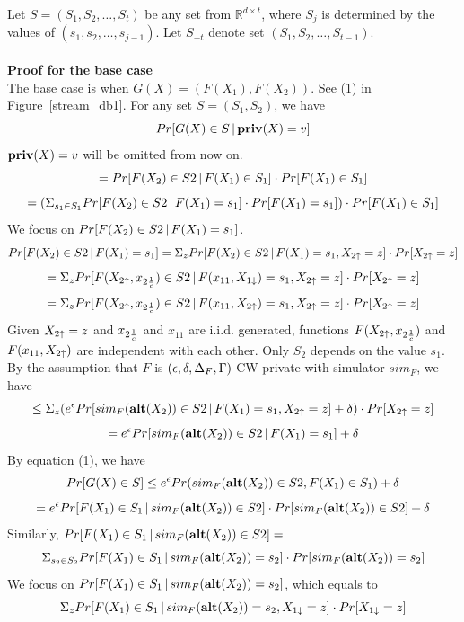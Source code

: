 \documentclass[11pt]{article}
\begin{document}
Let $S=(S_{1}, S_{2}, \dots, S_{t} )$ be any set from $\mathbb {R} ^{d \times t}$, where $S_{j}$ is determined by the values of $(s_{1}, s_{2} , \dots, s_{j-1})$. Let $S_{-t}$ denote set $(S_{1}, S_{2}, \dots, S_{t-1} )$.
\\
\\
{\bf Proof for the base case}\\
The base case is when $G(X) = (F(X_{1}) , F(X_{2}))$. See (1) in Figure~\ref{stream_db1}.
For any set $S= (S_{1}, S_{2})$, we have
\[
Pr[G(X) \in S\,|\, {\bf priv}(X) = v ]
\]
${\bf priv}(X) =v$ will be omitted from now on.
\[
=Pr[F(X_{2}) \in S{2}\,|\, F(X_{1}) \in S_{1}] \cdot Pr[F(X_{1}) \in S_{1}]
\]
\begin{equation}
=(\Sigma_{s_{1} \in S_{1}} Pr[F(X_{2}) \in S{2}\,|\,  F(X_{1}) = s_{1}] \cdot Pr[F(X_{1}) = s_{1}])\cdot Pr[F(X_{1}) \in S_{1}]
\end{equation}
We focus on $Pr[F(X_{2}) \in S{2}\,|\,  F(X_{1}) = s_{1}] $.
\[
Pr[F(X_{2}) \in S{2}\,|\,  F(X_{1}) = s_{1}] = \Sigma_{z} Pr[F(X_{2}) \in S{2}\,|\,  F(X_{1}) = s_{1}, X_{2 \uparrow} =z] \cdot Pr [X_{2 \uparrow} = z]
\]
\[
= \Sigma_{z} Pr[F(X_{2 \uparrow}, x_{2 \frac{1}{c}}) \in S{2}\,|\, F(x_{11}, X_{1 \downarrow})=s_{1}, X_{2 \uparrow}=z] \cdot Pr [X_{2 \uparrow} = z]
\]
\[
= \Sigma_{z} Pr[F(X_{2 \uparrow}, x_{2 \frac{1}{c}}) \in S{2}\,|\, F(x_{11}, X_{2 \uparrow})=s_{1}, X_{2 \uparrow}=z] \cdot Pr [X_{2 \uparrow} = z]
\]
Given $X_{2 \uparrow}=z$ and $x_{2 \frac{1}{c}}$ and $x_{11}$ are i.i.d. generated, functions $F(X_{2 \uparrow}, x_{2 \frac{1}{c}})$ and $F(x_{11}, X_{2 \uparrow})$ are independent with each other. Only $S_{2}$ depends on the value $s_{1}$. By the assumption that $F$ is $(\epsilon, \delta, \Delta_{F}, \Gamma)$-CW private with simulator $sim_{F}$, we have
\[
\leq \Sigma_{z} (e^{\epsilon}  Pr[sim_{F}({\bf alt}(X_{2})) \in S{2}\,|\, F(X_{1})=s_{1}, X_{2 \uparrow}=z]+\delta) \cdot Pr [X_{2 \uparrow} = z]
\]
\[
=e^{\epsilon}  Pr[sim_{F}({\bf alt}(X_{2})) \in S{2}\,|\, F(X_{1})=s_{1}]+\delta
\]
By equation (1), we have
\[
Pr [G(X) \in S] \leq e^{\epsilon}  Pr({sim_{F}({\bf alt}(X_{2})) \in S{2}}, { F(X_{1}) \in S_{1}})+\delta
\]
\begin{equation}
=e^{\epsilon} Pr[ F(X_{1}) \in S_{1}\,|\,{sim_{F}({\bf alt}(X_{2})) \in S{2}}] \cdot Pr [{sim_{F}({\bf alt}(X_{2})) \in S{2}}] +\delta
\end{equation}
Similarly, $
Pr[ F(X_{1}) \in S_{1}\,|\,sim_{F}({\bf alt}(X_{2})) \in S{2}]=
$
\begin{equation}
\Sigma_{s_{2}\in S_{2}} Pr[ F(X_{1}) \in S_{1}\,|\,sim_{F}({\bf alt}(X_{2})) = s_{2}] \cdot Pr [sim_{F}({\bf alt}(X_{2})) = s_{2}]
\end{equation}
We focus on $Pr[ F(X_{1}) \in S_{1}\,|\,sim_{F}({\bf alt}(X_{2})) = s_{2}]$, which equals to
\[
\Sigma_{z} Pr[ F(X_{1}) \in S_{1}\,|\,sim_{F}({\bf alt}(X_{2})) = s_{2}, X_{1 \downarrow} =z] \cdot Pr[X_{1 \downarrow}=z]
\]
\end{document}
